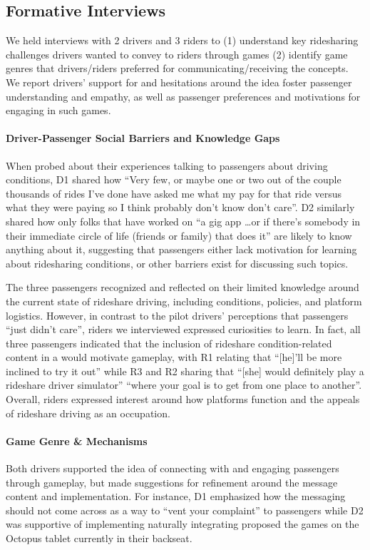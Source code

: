 \subsection{Formative Interviews} \label{pilot}
We held interviews with 2 drivers and 3 riders to (1) understand key ridesharing challenges drivers wanted to convey to riders through games (2) identify game genres that drivers/riders preferred for communicating/receiving the concepts. We report drivers’ support for and hesitations around the idea foster passenger understanding and empathy, as well as passenger preferences and motivations for engaging in such games.

\paragraph{Driver-Passenger Social Barriers and Knowledge Gaps} When probed about their experiences talking to passengers about driving conditions, D1 shared how ``Very few, or maybe one or two out of the couple thousands of rides I’ve done have asked me what my pay for that ride versus what they were paying so I think probably don't know don't care''. 
D2 similarly shared how only folks that have worked on ``a gig app \dots or if there's somebody in their immediate circle of life (friends or family) that does it'' are likely to know anything about it, suggesting that passengers either lack motivation for learning about ridesharing conditions, or other barriers exist for discussing such topics.

The three passengers recognized and reflected on their limited knowledge around the current state of rideshare driving, including conditions, policies, and platform logistics. However, in contrast to the pilot drivers’ perceptions that passengers ``just didn’t care'', riders we interviewed expressed curiosities to learn. In fact, all three passengers indicated that the inclusion of rideshare condition-related content in a would motivate gameplay, with 
R1 relating that ``[he]'ll be more inclined to try it out'' while R3 and R2 sharing that ``[she] would definitely play a rideshare driver simulator'' ``where your goal is to get from one place to another''. Overall, riders expressed interest around how platforms function and the appeals of rideshare driving as an occupation. 


\paragraph{Game Genre \& Mechanisms} 
Both drivers supported the idea of connecting with and engaging passengers through gameplay, but made suggestions for refinement around the message content and implementation. For instance, D1 emphasized how the messaging should not come across as a way to ``vent your complaint'' to passengers while D2 was supportive of implementing naturally integrating proposed the games on the Octopus tablet currently in their backseat.	

